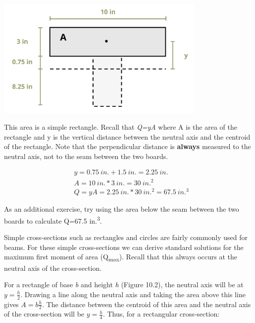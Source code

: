 \documentclass[
  letterpaper,
  DIV=11,
  numbers=noendperiod]{scrreprt}
\theoremstyle{definition}
\theoremstyle{remark}
\begin{document}
\begin{tcolorbox}
\begin{tcolorbox}
\begin{center}
\includegraphics[width=4in,height=\textheight]{images/CH10 PNGs/example 10.2 part 2.png}
\end{center}

This area is a simple rectangle. Recall that \emph{Q=yA} where A is the
area of the rectangle and y is the vertical distance between the neutral
axis and the centroid of the rectangle. Note that the perpendicular
distance is \textbf{always} measured to the neutral axis, not to the
seam between the two boards.

\[
\begin{aligned}
& y=0.75{~in.}+1.5{~in.}=2.25{~in.} \\
& A=10{~in.} * 3{~in.}=30{~in.}^2 \\
& Q=y A=2.25{~in.} * 30{~in.}^2=67.5{~in.}^3
\end{aligned}
\]

As an additional exercise, try using the area below the seam between the
two boards to calculate Q=67.5 in.\textsuperscript{3}.

\end{tcolorbox}

\end{tcolorbox}

Simple cross-sections such as rectangles and circles are fairly commonly
used for beams. For these simple cross-sections we can derive standard
solutions for the maximum first moment of area (Q\textsubscript{max}).
Recall that this always occurs at the neutral axis of the cross-section.

For a rectangle of base \emph{b} and height \emph{h} (Figure 10.2), the
neutral axis will be at \(y=\frac{h}{2}\). Drawing a line along the
neutral axis and taking the area above this line gives
\(A=b \frac{h}{2}\). The distance between the centroid of this area and
the neutral axis of the cross-section will be \(y=\frac{h}{4}\). Thus,
for a rectangular cross-section:
\end{document}
